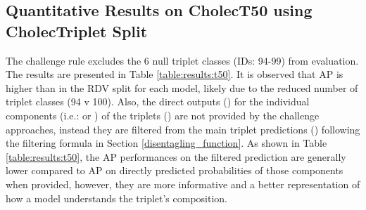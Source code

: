 \documentclass{article}
\begin{document}
{\subsection{Quantitative Results on CholecT50 using CholecTriplet Split}
The challenge rule excludes the 6 null triplet classes (IDs: 94-99) from evaluation. The results are presented in Table \ref{table:results:t50}.
It is observed that AP is higher than in the RDV split for each model, likely due to the reduced number of triplet classes (94 v 100).
Also, the direct outputs () for the individual components (i.e.:  or ) of the triplets () are not provided by the challenge approaches, instead they are filtered from the main triplet predictions () following the filtering formula in Section \ref{disentagling_function}.
As shown in Table \ref{table:results:t50}, the AP performances on the filtered prediction are generally lower compared to AP on directly predicted probabilities of those components when provided, however, they are more informative and a better representation of how a model understands the triplet's composition.




\begin{table}[htp]
\centering
    \setlength{\tabcolsep}{9pt}
    \captionsetup{skip=0pt,singlelinecheck=off,justification=raggedright}
    \caption{Benchmark triplet recognition AP (\%) on CholecT50 dataset using CholecTriplet split.}
    \label{table:results:t50}
\end{table}


}
\end{document}
